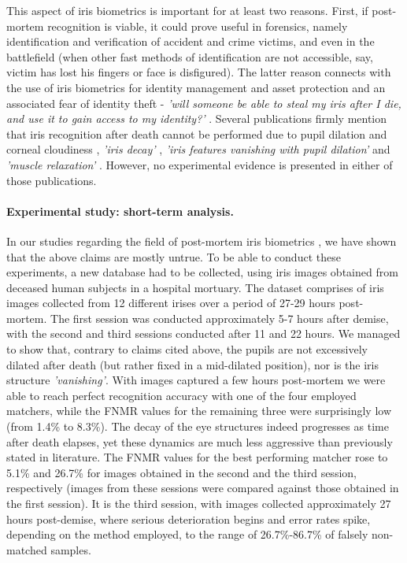 \documentclass[a4paper,twoside]{article}
\begin{document}
This aspect of iris biometrics is important for at least two reasons. First, if post-mortem recognition is viable, it could prove useful in forensics, namely identification and verification of accident and crime victims, and even in the battlefield (when other fast methods of identification are not accessible, say, victim has lost his fingers or face is disfigured). The latter reason connects with the use of iris biometrics for identity management and asset protection and an associated fear of identity theft - \emph{'will someone be able to steal my iris after I die, and use it to gain access to my identity?'} \cite{ScienceFocusPostMortem}. Several publications firmly mention that iris recognition after death cannot be performed due to pupil dilation and corneal cloudiness \cite{DaugmanPostMortem}, \emph{'iris decay'} \cite{SaeedPostMortem}, \emph{'iris features vanishing with pupil dilation'} and \emph{'muscle relaxation'} \cite{IrisGuardPostMortem}\cite{IriTechPostMortem}. However, no experimental evidence is presented in either of those publications. 

\paragraph{Experimental study: short-term analysis.} 
 In our studies regarding the field of post-mortem iris biometrics \cite{TrokielewiczPostMortemICB2016}, \cite{TrokielewiczPostMortemBTAS2016} we have shown that the above claims are mostly untrue. To be able to conduct these experiments, a new database had to be collected, using iris images obtained from deceased human subjects in a hospital mortuary. The dataset comprises of iris images collected from 12 different irises over a period of 27-29 hours post-mortem. The first session was conducted approximately 5-7 hours after demise, with the second and third sessions conducted after 11 and 22 hours. We managed to show that, contrary to claims cited above, the pupils are not excessively dilated after death (but rather fixed in a mid-dilated position), nor is the iris structure \emph{'vanishing'}. With images captured a few hours post-mortem we were able to reach perfect recognition accuracy with one of the four employed matchers, while the FNMR values for the remaining three were surprisingly low (from 1.4\% to 8.3\%). The decay of the eye structures indeed progresses as time after death elapses, yet these dynamics are much less aggressive than previously stated in literature. The FNMR values for the best performing matcher rose to 5.1\% and 26.7\% for images obtained in the second and the third session, respectively (images from these sessions were compared against those obtained in the first session). It is the third session, with images collected approximately 27 hours post-demise, where serious deterioration begins and error rates spike, depending on the method employed, to the range of 26.7\%-86.7\% of falsely non-matched samples.
\end{document}

